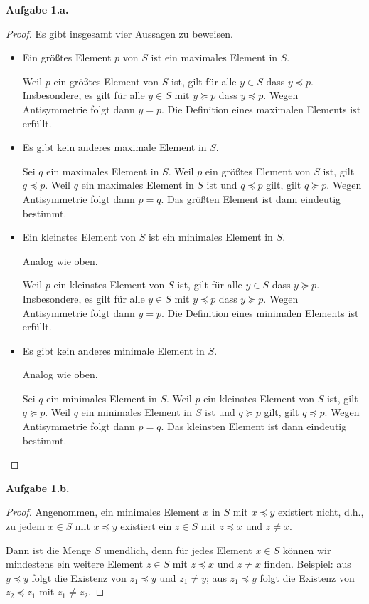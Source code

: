 \documentclass[12pt]{extarticle}
\newcommand{\aufgn}[1]{\textbf{Aufgabe #1.}}
\begin{document}
\aufgn{1.a}
\begin{proof}
Es gibt insgesamt vier Aussagen zu beweisen.

\begin{itemize}
\item Ein größtes Element \(p\) von \(S\) ist ein maximales
  Element in \(S\).

  Weil \(p\) ein größtes Element von \(S\) ist, gilt für
  alle \(y \in S\) dass \(y \preceq p\).  Insbesondere, es
  gilt für alle \(y \in S\) mit \(y \succeq p\) dass
  \(y \preceq p\).  Wegen Antisymmetrie folgt dann
  \(y = p\).  Die Definition eines maximalen Elements ist
  erfüllt.
\item Es gibt kein anderes maximale Element in \(S\).

  Sei \(q\) ein maximales Element in \(S\).  Weil \(p\) ein
  größtes Element von \(S\) ist, gilt \(q \preceq p\).  Weil
  \(q\) ein maximales Element in \(S\) ist und
  \(q \preceq p\) gilt, gilt \(q \succeq p\).  Wegen
  Antisymmetrie folgt dann \(p = q\).  Das größten Element
  ist dann eindeutig bestimmt.
\item Ein kleinstes Element von \(S\) ist ein
  minimales Element in \(S\).

  Analog wie oben.

  Weil \(p\) ein kleinstes Element von \(S\) ist, gilt für
  alle \(y \in S\) dass \(y \succeq p\).  Insbesondere, es
  gilt für alle \(y \in S\) mit \(y \preceq p\) dass
  \(y \succeq p\).  Wegen Antisymmetrie folgt dann
  \(y = p\).  Die Definition eines minimalen Elements ist
  erfüllt.
\item Es gibt kein anderes minimale Element in \(S\).

  Analog wie oben.

  Sei \(q\) ein minimales Element in \(S\).  Weil \(p\) ein
  kleinstes Element von \(S\) ist, gilt \(q \succeq p\).
  Weil \(q\) ein minimales Element in \(S\) ist und
  \(q \succeq p\) gilt, gilt \(q \preceq p\).  Wegen
  Antisymmetrie folgt dann \(p = q\).  Das kleinsten
  Element ist dann eindeutig bestimmt.
\end{itemize}
\end{proof}

\aufgn{1.b}
\begin{proof}
  Angenommen, ein minimales Element \(x\) in \(S\) mit
  \(x \preceq y\) existiert nicht, d.h., zu jedem
  \(x \in S\) mit \(x \preceq y\) existiert ein \(z \in S\)
  mit \(z \preceq x\) und \(z \ne x\).

  Dann ist die Menge \(S\) unendlich, denn für jedes
  Element \(x \in S\) können wir mindestens ein weitere
  Element \(z \in S\) mit \(z \preceq x\) und \(z \ne x\)
  finden.  Beispiel: aus \(y \preceq y\) folgt die
  Existenz von \(z_1 \preceq y\) und \(z_1 \ne y\); aus
  \(z_1 \preceq y\) folgt die Existenz von
  \(z_2 \preceq z_1\) mit \(z_1 \ne z_2\).
\end{proof}
\end{document}
